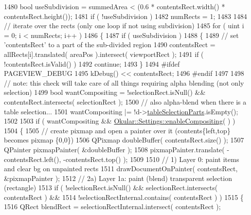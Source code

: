 \begin{DoxyCode}
1480         \textcolor{keywordtype}{bool} useSubdivision = summedArea < (0.6 * contentsRect.width() * contentsRect.height());
1481         \textcolor{keywordflow}{if} ( !useSubdivision )
1482             numRects = 1;
1483 
1484         \textcolor{comment}{// iterate over the rects (only one loop if not using subdivision)}
1485         \textcolor{keywordflow}{for} ( uint i = 0; i < numRects; i++ )
1486         \{
1487             \textcolor{keywordflow}{if} ( useSubdivision )
1488             \{
1489                 \textcolor{comment}{// set 'contentsRect' to a part of the sub-divided region}
1490                 contentsRect = allRects[i].translated( areaPos ).intersect( viewportRect );
1491                 \textcolor{keywordflow}{if} ( !contentsRect.isValid() )
1492                     \textcolor{keywordflow}{continue};
1493             \}
1494 \textcolor{preprocessor}{#ifdef PAGEVIEW\_DEBUG}
1495             kDebug() << contentsRect;
1496 \textcolor{preprocessor}{#endif}
1497 
1498             \textcolor{comment}{// note: this check will take care of all things requiring alpha blending (not only selection)}
1499             \textcolor{keywordtype}{bool} wantCompositing = !selectionRect.isNull() && contentsRect.intersects( selectionRect );
1500             \textcolor{comment}{// also alpha-blend when there is a table selection...}
1501             wantCompositing |= !d->\hyperlink{classPageViewPrivate_aec476c0b74867740803d4ba34393b154}{tableSelectionParts}.isEmpty();
1502 
1503             \textcolor{keywordflow}{if} ( wantCompositing && \hyperlink{classOkular_1_1Settings_a975dbba9c56b1a9df965dd2766aefc60}{Okular::Settings::enableCompositing}(
      ) )
1504             \{
1505                 \textcolor{comment}{// create pixmap and open a painter over it (contents\{left,top\} becomes pixmap \{0,0\})}
1506                 QPixmap doubleBuffer( contentsRect.size() );
1507                 QPainter pixmapPainter( &doubleBuffer );
1508                 pixmapPainter.translate( -contentsRect.left(), -contentsRect.top() );
1509 
1510                 \textcolor{comment}{// 1) Layer 0: paint items and clear bg on unpainted rects}
1511                 drawDocumentOnPainter( contentsRect, &pixmapPainter );
1512                 \textcolor{comment}{// 2a) Layer 1a: paint (blend) transparent selection (rectangle)}
1513                 \textcolor{keywordflow}{if} ( !selectionRect.isNull() && selectionRect.intersects( contentsRect ) &&
1514                     !selectionRectInternal.contains( contentsRect ) )
1515                 \{
1516                     QRect blendRect = selectionRectInternal.intersect( contentsRect );

\end{DoxyCode}
